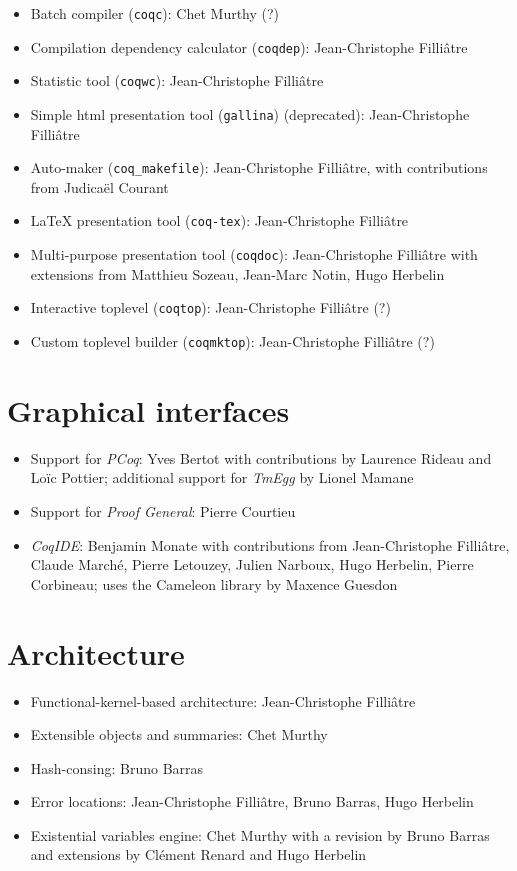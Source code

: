 \documentclass{article}
\begin{document}
\begin{itemize}
\item Batch compiler (\texttt{coqc}):  Chet Murthy (?)
\item Compilation dependency calculator (\texttt{coqdep}):
  Jean-Christophe Filliâtre
\item Statistic tool (\texttt{coqwc}): Jean-Christophe Filliâtre
\item Simple html presentation tool (\texttt{gallina}) (deprecated): Jean-Christophe Filliâtre
\item Auto-maker (\texttt{coq\_makefile}): Jean-Christophe Filliâtre,
  with contributions from Judicaël Courant
\item LaTeX presentation tool (\texttt{coq-tex}): Jean-Christophe Filliâtre
\item Multi-purpose presentation tool (\texttt{coqdoc}): Jean-Christophe Filliâtre with extensions from
  Matthieu Sozeau, Jean-Marc Notin, Hugo Herbelin
\item Interactive toplevel (\texttt{coqtop}): Jean-Christophe Filliâtre (?)
\item Custom toplevel builder (\texttt{coqmktop}): Jean-Christophe Filliâtre (?)
\end{itemize}

\section{Graphical interfaces}

\begin{itemize}
\item Support for {\em PCoq}: Yves Bertot with contributions by
  Laurence Rideau and Loïc Pottier; additional support for {\em TmEgg}
  by Lionel Mamane
\item Support for {\em Proof General}: Pierre Courtieu
\item {\em CoqIDE}: Benjamin Monate with contributions from
  Jean-Christophe Filliâtre, Claude Marché, Pierre Letouzey, Julien
  Narboux, Hugo Herbelin, Pierre Corbineau; uses the Cameleon library
  by Maxence Guesdon
\end{itemize}

\section{Architecture}

\begin{itemize}
\item Functional-kernel-based architecture: Jean-Christophe Filliâtre
\item Extensible objects and summaries: Chet Murthy
\item Hash-consing: Bruno Barras
\item Error locations: Jean-Christophe Filliâtre, Bruno Barras, Hugo Herbelin
\item Existential variables engine: Chet Murthy with a revision by
  Bruno Barras and extensions by Clément Renard and Hugo Herbelin
\end{itemize}
\end{document}
